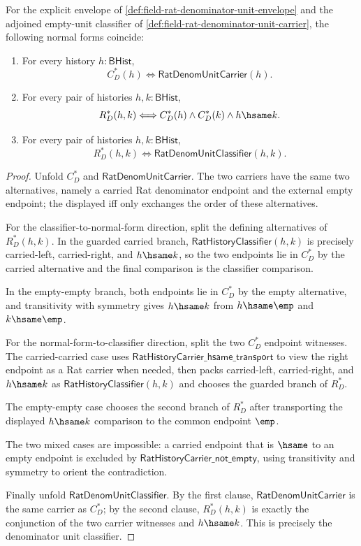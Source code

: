 \begin{theorem}
\label{thm:field-rat-denominator-unit-envelope-classifier-normal-form}
For the explicit envelope of
\autoref{def:field-rat-denominator-unit-envelope} and the adjoined empty-unit
classifier of \autoref{def:field-rat-denominator-unit-carrier}, the following
normal forms coincide:
\begin{enumerate}
  \item For every history $h:\mathsf{BHist}$,
  $$
  C_D^\ast(h)\Longleftrightarrow\mathsf{RatDenomUnitCarrier}(h).
  $$
  \item For every pair of histories $h,k:\mathsf{BHist}$,
  $$
  R_D^\ast(h,k)\Longleftrightarrow
  C_D^\ast(h)\land C_D^\ast(k)\land h\hsame k.
  $$
  \item For every pair of histories $h,k:\mathsf{BHist}$,
  $$
  R_D^\ast(h,k)\Longleftrightarrow
  \mathsf{RatDenomUnitClassifier}(h,k).
  $$
\end{enumerate}
\end{theorem}
\begin{proof}
Unfold $C_D^\ast$ and $\mathsf{RatDenomUnitCarrier}$. The two carriers have the
same two alternatives, namely a carried Rat denominator endpoint and the
external empty endpoint; the displayed iff only exchanges the order of these
alternatives.

For the classifier-to-normal-form direction, split the defining alternatives of
$R_D^\ast(h,k)$. In the guarded carried branch,
$\mathsf{RatHistoryClassifier}(h,k)$ is precisely carried-left, carried-right,
and $h\hsame k$, so the two endpoints lie in $C_D^\ast$ by the carried
alternative and the final comparison is the classifier comparison.

In the empty-empty branch, both endpoints lie in $C_D^\ast$ by the empty
alternative, and transitivity with symmetry gives $h\hsame k$ from
$h\hsame\emp$ and $k\hsame\emp$.

For the normal-form-to-classifier direction, split the two $C_D^\ast$ endpoint
witnesses. The carried-carried case uses
$\mathsf{RatHistoryCarrier\_hsame\_transport}$ to view the right endpoint as a
Rat carrier when needed, then packs carried-left, carried-right, and $h\hsame k$
as $\mathsf{RatHistoryClassifier}(h,k)$ and chooses the guarded branch of
$R_D^\ast$.

The empty-empty case chooses the second branch of $R_D^\ast$ after transporting
the displayed $h\hsame k$ comparison to the common endpoint $\emp$.

The two mixed cases are impossible: a carried endpoint that is $\hsame$ to an
empty endpoint is excluded by $\mathsf{RatHistoryCarrier\_not\_empty}$, using
transitivity and symmetry to orient the contradiction.

Finally unfold $\mathsf{RatDenomUnitClassifier}$. By the first clause,
$\mathsf{RatDenomUnitCarrier}$ is the same carrier as $C_D^\ast$; by the second
clause, $R_D^\ast(h,k)$ is exactly the conjunction of the two carrier witnesses
and $h\hsame k$. This is precisely the denominator unit classifier.
\end{proof}

